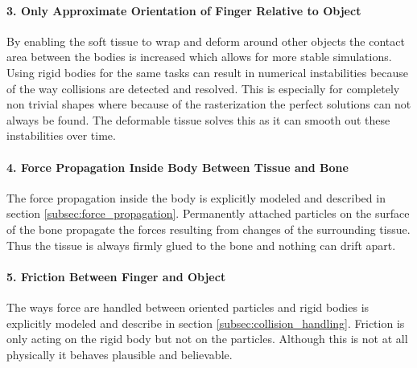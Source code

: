 \paragraph{3. Only Approximate Orientation of Finger Relative to Object}

By enabling the soft tissue to wrap and deform around other objects the contact area between the bodies is increased which allows for more stable simulations. Using rigid bodies for the same tasks can result in numerical instabilities because of the way collisions are detected and resolved. This is especially for completely non trivial shapes where because of the rasterization the perfect solutions can not always be found. The deformable tissue solves this as it can smooth out these instabilities over time.

\paragraph{4. Force Propagation Inside Body Between Tissue and Bone}

The force propagation inside the body is explicitly modeled and described in section \ref{subsec:force_propagation}. Permanently attached particles on the surface of the bone propagate the forces resulting from changes of the surrounding tissue. Thus the tissue is always firmly glued to the bone and nothing can drift apart.

\paragraph{5. Friction Between Finger and Object}

The ways force are handled between oriented particles and rigid bodies is explicitly modeled and describe in section \ref{subsec:collision_handling}. Friction is only acting on the rigid body but not on the particles. Although this is not at all physically it behaves plausible and believable.
